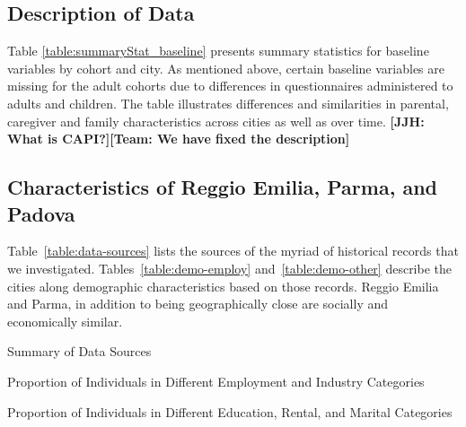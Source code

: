 \subsection{Description of Data}

Table \ref{table:summaryStat_baseline} presents summary statistics for baseline variables by cohort and city. As mentioned above, certain baseline variables are missing for the adult cohorts due to differences in questionnaires administered to adults and children. The table illustrates differences and similarities in parental, caregiver and family characteristics across cities as well as over time. \textbf{[JJH: What is CAPI?][Team: We have fixed the description]}

\begin{landscape}

\end{landscape}

\subsection{Characteristics of Reggio Emilia, Parma, and Padova}
\label{app:characteristics-cities}

Table~\ref{table:data-sources} lists the sources of the myriad of historical records that we investigated. Tables~\ref{table:demo-employ} and~\ref{table:demo-other} describe the cities along demographic characteristics based on those records. Reggio Emilia and Parma, in addition to being geographically close are socially and economically similar.

\begin{table}[H]
\centering
\footnotesize
	\caption{Summary of Data Sources} \label{table:data-sources}
	
\end{table}


\begin{landscape}
\begin{table}[ht!]
\begin{center}
\scriptsize{
	\caption{Proportion of Individuals in Different Employment and Industry Categories} \label{table:demo-employ}
	
}
\end{center}
\end{table}
\end{landscape}

\begin{landscape}
\begin{table}[ht!]
\begin{center}
\scriptsize{
	\caption{Proportion of Individuals in Different Education, Rental, and Marital Categories} \label{table:demo-other}
	
}
\end{center}
\end{table}
\end{landscape}


